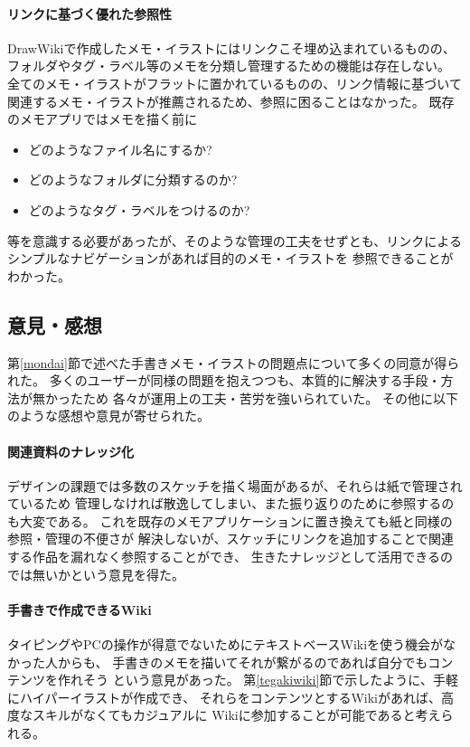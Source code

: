 \paragraph*{リンクに基づく優れた参照性}
DrawWikiで作成したメモ・イラストにはリンクこそ埋め込まれているものの、フォルダやタグ・ラベル等のメモを分類し管理するための機能は存在しない。
全てのメモ・イラストがフラットに置かれているものの、リンク情報に基づいて関連するメモ・イラストが推薦されるため、参照に困ることはなかった。
既存のメモアプリではメモを描く前に
\begin{itemize}
    \item どのようなファイル名にするか?
    \item どのようなフォルダに分類するのか?
    \item どのようなタグ・ラベルをつけるのか?
\end{itemize}
等を意識する必要があったが、そのような管理の工夫をせずとも、リンクによるシンプルなナビゲーションがあれば目的のメモ・イラストを
参照できることがわかった。

\subsection{意見・感想}
第\ref{mondai}節で述べた手書きメモ・イラストの問題点について多くの同意が得られた。
多くのユーザーが同様の問題を抱えつつも、本質的に解決する手段・方法が無かったため
各々が運用上の工夫・苦労を強いられていた。
その他に以下のような感想や意見が寄せられた。

\paragraph*{関連資料のナレッジ化}
デザインの課題では多数のスケッチを描く場面があるが、それらは紙で管理されているため
管理しなければ散逸してしまい、また振り返りのために参照するのも大変である。
これを既存のメモアプリケーションに置き換えても紙と同様の参照・管理の不便さが
解決しないが、スケッチにリンクを追加することで関連する作品を漏れなく参照することができ、
生きたナレッジとして活用できるのでは無いかという意見を得た。

\paragraph*{手書きで作成できるWiki}
タイピングやPCの操作が得意でないためにテキストベースWikiを使う機会がなかった人からも、
手書きのメモを描いてそれが繋がるのであれば自分でもコンテンツを作れそう
という意見があった。
第\ref{tegakiwiki}節で示したように、手軽にハイパーイラストが作成でき、
それらをコンテンツとするWikiがあれば、高度なスキルがなくてもカジュアルに
Wikiに参加することが可能であると考えられる。

